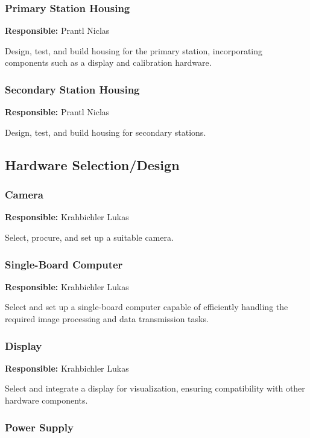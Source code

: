 \subsubsection{Primary Station Housing}

\textbf{Responsible:} Prantl Niclas

Design, test, and build housing for the primary station, incorporating components such as a display and calibration hardware.

\subsubsection{Secondary Station Housing}

\textbf{Responsible:} Prantl Niclas

Design, test, and build housing for secondary stations.

\subsection{Hardware Selection/Design}

\subsubsection{Camera}

\textbf{Responsible:} Krahbichler Lukas

Select, procure, and set up a suitable camera.

\subsubsection{Single-Board Computer}

\textbf{Responsible:} Krahbichler Lukas

Select and set up a single-board computer capable of efficiently handling the required image processing and data transmission tasks.

\subsubsection{Display}

\textbf{Responsible:} Krahbichler Lukas

Select and integrate a display for visualization, ensuring compatibility with other hardware components.

\subsubsection{Power Supply}

